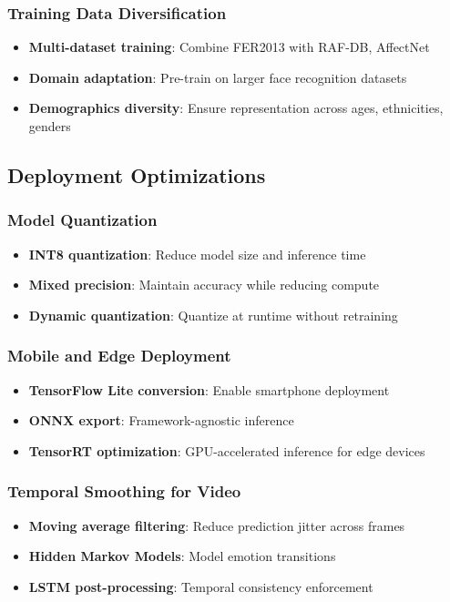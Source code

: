 \documentclass[12pt,a4paper]{article}
\begin{document}
\subsubsection{Training Data Diversification}
\begin{itemize}[leftmargin=*]
    \item \textbf{Multi-dataset training}: Combine FER2013 with RAF-DB, AffectNet
    \item \textbf{Domain adaptation}: Pre-train on larger face recognition datasets
    \item \textbf{Demographics diversity}: Ensure representation across ages, ethnicities, genders
\end{itemize}

\subsection{Deployment Optimizations}

\subsubsection{Model Quantization}
\begin{itemize}[leftmargin=*]
    \item \textbf{INT8 quantization}: Reduce model size and inference time
    \item \textbf{Mixed precision}: Maintain accuracy while reducing compute
    \item \textbf{Dynamic quantization}: Quantize at runtime without retraining
\end{itemize}

\subsubsection{Mobile and Edge Deployment}
\begin{itemize}[leftmargin=*]
    \item \textbf{TensorFlow Lite conversion}: Enable smartphone deployment
    \item \textbf{ONNX export}: Framework-agnostic inference
    \item \textbf{TensorRT optimization}: GPU-accelerated inference for edge devices
\end{itemize}

\subsubsection{Temporal Smoothing for Video}
\begin{itemize}[leftmargin=*]
    \item \textbf{Moving average filtering}: Reduce prediction jitter across frames
    \item \textbf{Hidden Markov Models}: Model emotion transitions
    \item \textbf{LSTM post-processing}: Temporal consistency enforcement
\end{itemize}
\end{document}
